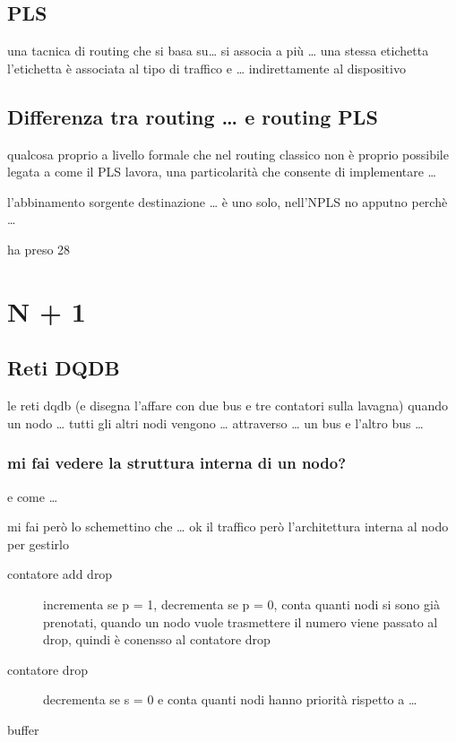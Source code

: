 \documentclass[11pt]{article}
\begin{document}
\subsection{PLS}
\label{sec:org81e8632}
una tacnica di routing che si basa su\ldots{}
si associa a più \ldots{} una stessa etichetta
l'etichetta è associata al tipo di traffico e \ldots{} indirettamente al dispositivo

\subsection{Differenza tra routing \ldots{} e routing PLS}
\label{sec:org93a2f6d}
qualcosa proprio a livello formale che nel routing classico non è proprio possibile
legata a come il PLS lavora, una particolarità che consente di implementare \ldots{}

l'abbinamento sorgente destinazione \ldots{} è uno solo, nell'NPLS no apputno perchè \ldots{}

ha preso 28

\section{N + 1}
\label{sec:org537d5d8}
\subsection{Reti DQDB}
\label{sec:orgd3cf774}
le reti dqdb (e disegna l'affare con due bus e tre contatori sulla lavagna)
quando un nodo \ldots{} tutti gli altri nodi vengono \ldots{} attraverso \ldots{} un bus e l'altro bus \ldots{}

\subsubsection{mi fai vedere la struttura interna di un nodo?}
\label{sec:org50f3b31}
e come \ldots{}

mi fai però lo schemettino che \ldots{}
ok il traffico però l'architettura interna al nodo per gestirlo
\begin{description}
\item[{contatore add drop}] incrementa se p = 1, decrementa se p = 0, conta quanti nodi si sono già prenotati, quando un nodo vuole trasmettere il numero viene passato al drop, quindi è conensso al contatore drop
\item[{contatore drop}] decrementa se s = 0 e conta quanti nodi hanno priorità rispetto a \ldots{}
\item[{buffer}] 
\end{description}
\end{document}

